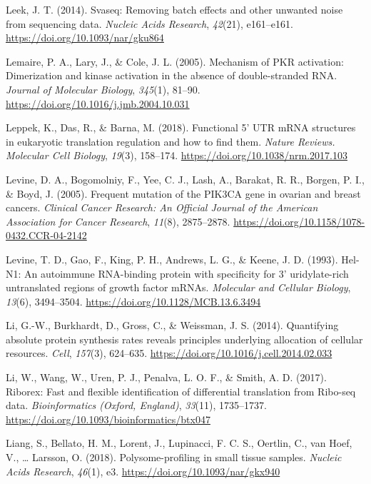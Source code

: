\documentclass[12pt,openany]{book}
\begin{document}
\hypertarget{ref-Leek2014}{}
Leek, J. T. (2014). Svaseq: Removing batch effects and other unwanted
noise from sequencing data. \emph{Nucleic Acids Research},
\emph{42}(21), e161--e161. \url{https://doi.org/10.1093/nar/gku864}

\hypertarget{ref-Lemaire2005}{}
Lemaire, P. A., Lary, J., \& Cole, J. L. (2005). Mechanism of PKR
activation: Dimerization and kinase activation in the absence of
double-stranded RNA. \emph{Journal of Molecular Biology}, \emph{345}(1),
81--90. \url{https://doi.org/10.1016/j.jmb.2004.10.031}

\hypertarget{ref-Leppek2018}{}
Leppek, K., Das, R., \& Barna, M. (2018). Functional 5' UTR mRNA
structures in eukaryotic translation regulation and how to find them.
\emph{Nature Reviews. Molecular Cell Biology}, \emph{19}(3), 158--174.
\url{https://doi.org/10.1038/nrm.2017.103}

\hypertarget{ref-Levine2005}{}
Levine, D. A., Bogomolniy, F., Yee, C. J., Lash, A., Barakat, R. R.,
Borgen, P. I., \& Boyd, J. (2005). Frequent mutation of the PIK3CA gene
in ovarian and breast cancers. \emph{Clinical Cancer Research: An
Official Journal of the American Association for Cancer Research},
\emph{11}(8), 2875--2878.
\url{https://doi.org/10.1158/1078-0432.CCR-04-2142}

\hypertarget{ref-Levine1993}{}
Levine, T. D., Gao, F., King, P. H., Andrews, L. G., \& Keene, J. D.
(1993). Hel-N1: An autoimmune RNA-binding protein with specificity for
3' uridylate-rich untranslated regions of growth factor mRNAs.
\emph{Molecular and Cellular Biology}, \emph{13}(6), 3494--3504.
\url{https://doi.org/10.1128/MCB.13.6.3494}

\hypertarget{ref-Li2014}{}
Li, G.-W., Burkhardt, D., Gross, C., \& Weissman, J. S. (2014).
Quantifying absolute protein synthesis rates reveals principles
underlying allocation of cellular resources. \emph{Cell}, \emph{157}(3),
624--635. \url{https://doi.org/10.1016/j.cell.2014.02.033}

\hypertarget{ref-Li2017}{}
Li, W., Wang, W., Uren, P. J., Penalva, L. O. F., \& Smith, A. D.
(2017). Riborex: Fast and flexible identification of differential
translation from Ribo-seq data. \emph{Bioinformatics (Oxford, England)},
\emph{33}(11), 1735--1737.
\url{https://doi.org/10.1093/bioinformatics/btx047}

\hypertarget{ref-Liang2018}{}
Liang, S., Bellato, H. M., Lorent, J., Lupinacci, F. C. S., Oertlin, C.,
van Hoef, V., \ldots{} Larsson, O. (2018). Polysome-profiling in small
tissue samples. \emph{Nucleic Acids Research}, \emph{46}(1), e3.
\url{https://doi.org/10.1093/nar/gkx940}
\end{document}
